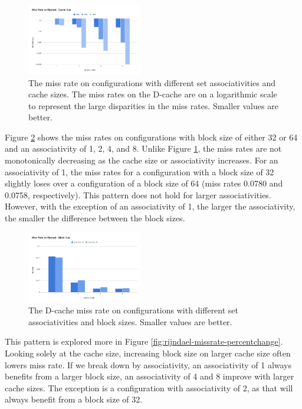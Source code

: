 \documentclass[conference]{IEEEtran}
\begin{document}
\begin{figure}[H]
    \centering
    \includegraphics[width=0.45\textwidth]{images/rijndael_cachesize.png}
    \caption{The miss rate on configurations with different set associativities and cache sizes. The miss rates on the D-cache are on a logarithmic scale to represent the large disparities in the miss rates. Smaller values are better.}
    \label{fig:rijndael-cachesize}
\end{figure}

Figure \ref{fig:rijndael-blocksize} shows the miss rates on configurations with block size of either 32 or 64 and an associativity of 1, 2, 4, and 8. Unlike Figure \ref{fig:rijndael-cachesize}, the miss rates are not monotonically decreasing as the cache size or associativity increases. For an associativity of 1, the miss rates for a configuration with a block size of 32 slightly loses over a configuration of a block size of 64 (miss rates 0.0780 and 0.0758, respectively). This pattern does not hold for larger associativities. However, with the exception of an associativity of 1, the larger the associativity, the smaller the difference between the block sizes. 

\begin{figure}[H]
  \centering
  \includegraphics[width=0.45\textwidth]{images/rijndael_blocksize.png}
  \caption{The D-cache miss rate on configurations with different set associativities and block sizes. Smaller values are better.}
  \label{fig:rijndael-blocksize}
\end{figure}

This pattern is explored more in Figure \ref{fig:rijndael-missrate-percentchange}. Looking solely at the cache size, increasing block size on larger cache size often lowers miss rate. If we break down by associativity, an associativity of 1 always benefits from a larger block size, an associativity of 4 and 8 improve with larger cache sizes. The exception is a configuration with associativity of 2, as that will always benefit from a block size of 32.
\end{document}
